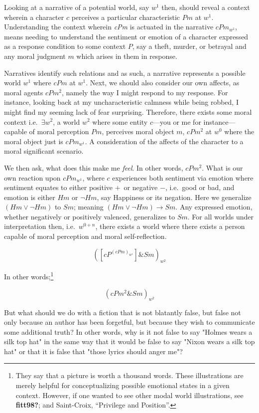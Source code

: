 \documentclass[
  12pt,
]{book}
\theoremstyle{definition}
\theoremstyle{definition}
\theoremstyle{definition}
\theoremstyle{definition}
\theoremstyle{remark}
\begin{document}
Looking at a narrative of a potential world, say \emph{\(w^1\)} then, should reveal a context wherein a character \(c\) perceives a particular characteristic \(Pm\) at \emph{\(w^1\)}. Understanding the context wherein \emph{cPm} is actuated in the narrative \(cPm_{w^{1}}\), means needing to understand the sentiment or emotion of a character expressed as a response condition to some context \(P\), say a theft, murder, or betrayal and any moral judgment \(m\) which arises in them in response.

Narratives identify such relations and as such, a narrative represents a possible world \(w^1\) where \(cPm\) at \(w^1\). Next, we should also consider our own affects, as moral agents \(cPm^{2}\), namely the way I might respond to my response. For instance, looking back at my uncharacteristic calmness while being robbed, I might find my seeming lack of fear surprising. Therefore, there exists some moral context i.e.~\(\exists w^2\), a world \(w^2\) where some entity \(c\)---you or me for instance---capable of moral perception \(Pm\), perceives moral object \(m\), \(cPm^{2}\) at \(w^0\) where the moral object just is \(cPm_{w^{1}}\). A consideration of the affects of the character to a moral significant scenario.

We then ask, what does this make me \emph{feel}. In other words, \(cPm^{2}\). What is our own reaction upon \(cPm_{w^1}\), where \(c\) experiences both sentiment via emotion where sentiment equates to either positive \(+\)~or negative \(-\), i.e.~good or bad, and emotion is either \(Hm\) or \(\neg Hm\), say Happiness or its negation. Here we generalize \(( Hm  \lor \neg  Hm)\) to \(Sm\); meaning \(( Hm \lor \neg Hm ) \rightarrow Sm\). Any expressed emotion, whether negatively or positively valenced, generalizes to \(Sm\). For all worlds under interpretation then, i.e.~\(w^{0+n}\), there exists a world where there exists a person capable of moral perception and moral self-reflection.

\[([cP^{( cPm )_{w^{1}}}] \& Sm)_{w^{2}}\]

In other words;\footnote{They say that a picture is worth a thousand words. These illustrations are merely helpful for conceptualizing possible emotional states in a given context. However, if one wanted to see other modal world illustrations, see \textbf{fitt98?}; and Saint-Croix, {``Privilege and {Position}''}.}

\[( cPm^{2} \& Sm )_{w^{2}}\]

But what should we do with a fiction that is not blatantly false, but false not only because an author has been forgetful, but because they wish to communicate some additional truth? In other words, why is it not false to say "Holmes wears a silk top hat" in the same way that it would be false to say "Nixon wears a silk top hat" or that it is false that "those lyrics should anger me"?
\end{document}
